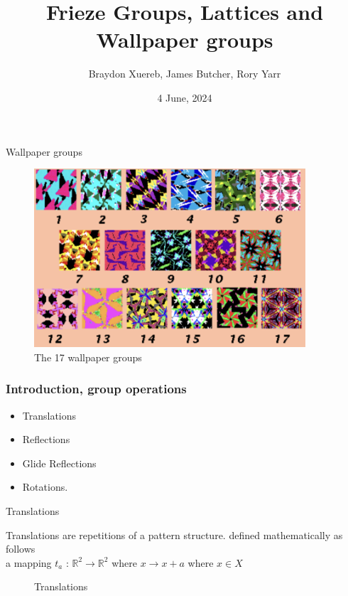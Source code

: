 \documentclass{beamer}
\title[The 17 Wallpaper Groups]{Frieze Groups, Lattices and Wallpaper groups}
\author{Braydon Xuereb, James Butcher, Rory Yarr}
\institute[University of Newcastle] %
{
  MATH3120 Abstract Algebra \\
  University of Newcastle
}
\date{4 June, 2024}
\theoremstyle{definition}
\begin{document}
\begin{frame}
  \titlepage
\end{frame}
\begin{frame}{Wallpaper groups}
    \begin{figure}
        \centering
        \includegraphics[width=0.9\textwidth]{Figures/WallpaperGroupsExample.png}
        \caption{The 17 wallpaper groups \cite{Clark1}}
        \label{fig:17WallpaperGroups}
    \end{figure}
\end{frame}

\begin{frame}
  \frametitle{Introduction, group operations}
  \begin{definition}
  \begin{itemize}
      \item Translations 
      \item Reflections
      \item Glide Reflections
      \item Rotations.
  \end{itemize}
  \end{definition}
\end{frame}



\begin{frame}{Translations }
\begin{definition}
     Translations are repetitions of a pattern structure.  defined mathematically as follows \\ 
    a mapping $t_a$ : $\mathbb{R}^2 \rightarrow \mathbb{R}^2$ where $x \rightarrow x + a $ where $x \in X$  \cite{Angela:2023}
\end{definition}
   \begin{figure}
        \centering
        \caption{Translations}
        \label{Reflection}
    \end{figure}
\end{frame}
\end{document}
